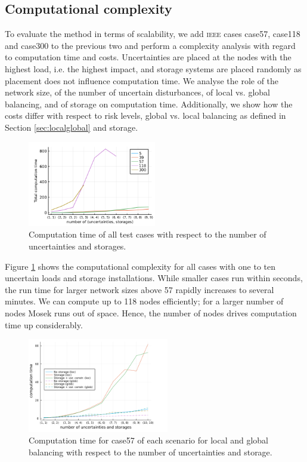 \documentclass[final,3p,times,twocolumn]{elsarticle}  %
\begin{document}
\subsection{Computational complexity}
\label{sec:complexityAnalysis}

To evaluate the method in terms of scalability, we add \textsc{ieee} cases case57, case118 and case300 to the previous two and perform a complexity analysis with regard to computation time and costs.
Uncertainties are placed at the nodes with the highest load, i.e. the highest impact, and storage systems are placed randomly as placement does not influence computation time. 
We analyse the role of the network size, of the number of uncertain disturbances, of local vs. global balancing, and of storage on computation time. 
Additionally, we show how the costs differ with respect to risk levels, global vs. local balancing as defined in Section \ref{sec:localglobal} and storage. 
\begin{figure}
    \centering
    \includegraphics[width=0.50\textwidth]{figures/complexity_cases_time_identity.png}
    \caption{Computation time of all test cases with respect to the number of uncertainties and storages.}
    \label{fig:complexity_all}
\end{figure}

Figure \ref{fig:complexity_all} shows the computational complexity for all cases with one to ten uncertain loads and storage installations. While smaller cases run within seconds, the run time for larger network sizes above 57 rapidly increases to several minutes. We can compute up to 118 nodes efficiently; for a larger number of nodes Mosek runs out of space. Hence, the number of nodes drives computation time up considerably.

\begin{figure}
    \centering
    \includegraphics[width=0.55\textwidth]{figures/complexity_computation time_cases.png}
    \caption{Computation time for case57 of each scenario for local and global balancing with respect to the number of uncertainties and storage.}
    \label{fig:57_complexity_szenarios}
\end{figure}
\end{document}

